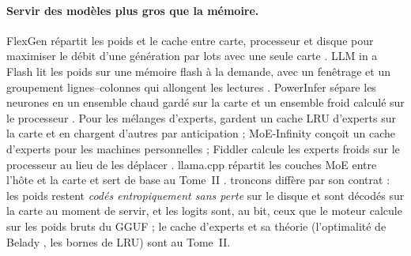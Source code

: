 \documentclass[11pt, a4paper]{article}
\theoremstyle{remark}
\begin{document}
\paragraph{Servir des modèles plus gros que la mémoire.} FlexGen répartit les poids et le cache entre carte, processeur et disque pour maximiser le débit d'une génération par lots avec une seule carte \citep{flexgen2023}. LLM in a Flash lit les poids sur une mémoire flash à la demande, avec un fenêtrage et un groupement lignes--colonnes qui allongent les lectures \citep{llminflash2024}. PowerInfer sépare les neurones en un ensemble chaud gardé sur la carte et un ensemble froid calculé sur le processeur \citep{powerinfer2024}. Pour les mélanges d'experts, \citet{mixtraloffload2023} gardent un cache LRU d'experts sur la carte et en chargent d'autres par anticipation ; MoE-Infinity conçoit un cache d'experts pour les machines personnelles \citep{moeinfinity2024} ; Fiddler calcule les experts froids sur le processeur au lieu de les déplacer \citep{fiddler2025}. llama.cpp répartit les couches MoE entre l'hôte et la carte et sert de base au Tome~II \citep{llamacpp2026b11515}. troncons diffère par son contrat : les poids restent \emph{codés entropiquement sans perte} sur le disque et sont décodés sur la carte au moment de servir, et les logits sont, au bit, ceux que le moteur calcule sur les poids bruts du GGUF ; le cache d'experts et sa théorie (l'optimalité de Belady \citep{belady1966}, les bornes de LRU) sont au Tome~II.
\end{document}
